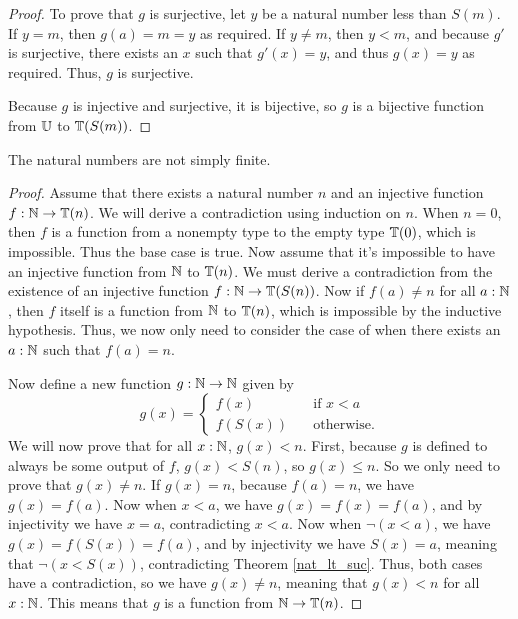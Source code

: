 \documentclass[../math.tex]{subfiles}
\begin{document}
\begin{proof}
    To prove that $g$ is surjective, let $y$ be a natural number less than
    $S(m)$.  If $y = m$, then $g(a) = m = y$ as required.  If $y \neq m$, then
    $y < m$, and because $g'$ is surjective, there exists an $x$ such that
    $g'(x) = y$, and thus $g(x) = y$ as required.  Thus, $g$ is surjective.

    Because $g$ is injective and surjective, it is bijective, so $g$ is a
    bijective function from $\mathbb{U}$ to $\mathbb{T}(S(m))$.
\end{proof}

\begin{theorem} \label{nat_not_finite}
    The natural numbers are not simply finite.
\end{theorem}
\begin{proof}
    Assume that there exists a natural number $n$ and an injective function $f :
    \mathbb{N} \to \mathbb{T}(n)$.  We will derive a contradiction using induction on $n$.  When
    $n = 0$, then $f$ is a function from a nonempty type to the empty type
    $\mathbb{T}(0)$, which is impossible.  Thus the base case is true.  Now assume that
    it's impossible to have an injective function from $\mathbb{N}$ to $\mathbb{T}(n)$.  We must
    derive a contradiction from the existence of an injective function $f : \mathbb{N}
    \to \mathbb{T}(S(n))$.  Now if $f(a) \neq n$ for all $a : \mathbb{N}$, then $f$ itself is a
    function from $\mathbb{N}$ to $\mathbb{T}(n)$, which is impossible by the inductive
    hypothesis.  Thus, we now only need to consider the case of when there
    exists an $a : \mathbb{N}$ such that $f(a) = n$.

    Now define a new function $g : \mathbb{N} \to \mathbb{N}$ given by
    \[
        g(x) = \begin{cases}
            f(x) \quad &\text{if $x < a$} \\
            f(S(x)) \quad &\text{otherwise.}
        \end{cases}
    \]
    We will now prove that for all $x : \mathbb{N}$, $g(x) < n$.  First, because $g$ is
    defined to always be some output of $f$, $g(x) < S(n)$, so $g(x) \leq n$.
    So we only need to prove that $g(x) \neq n$.  If $g(x) = n$, because $f(a) =
    n$, we have $g(x) = f(a)$.  Now when $x < a$, we have $g(x) = f(x) = f(a)$,
    and by injectivity we have $x = a$, contradicting $x < a$.  Now when $\neg(x
    < a)$, we have $g(x) = f(S(x)) = f(a)$, and by injectivity we have $S(x) =
    a$, meaning that $\neg(x < S(x))$, contradicting Theorem \ref{nat_lt_suc}.
    Thus, both cases have a contradiction, so we have $g(x) \neq n$, meaning
    that $g(x) < n$ for all $x : \mathbb{N}$.  This means that $g$ is a function from
    $\mathbb{N} \to \mathbb{T}(n)$.


\end{proof}
\end{document}
